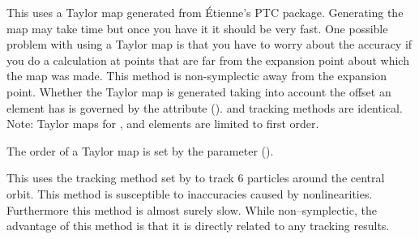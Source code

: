 \begin{description}
\item[\vn{Taylor}]
This uses a Taylor map generated from \'Etienne's PTC
package. Generating the map may take time but once you have it it
should be very fast. One possible problem with using a Taylor map is
that you have to worry about the accuracy if you do a calculation at
points that are far from the expansion point about which the map was
made. This method is non-symplectic away from the expansion
point. Whether the Taylor map is generated taking into account the
offset an element has is governed by the 
attribute ().  and 
tracking methods are identical. Note: Taylor maps for , and
 elements are limited to first order.

The order of a Taylor map is set by the 
parameter ().

\item[\vn{Tracking}]
This uses the tracking method set by  to track 6
particles around the central orbit. This method is susceptible to inaccuracies
caused by nonlinearities. Furthermore this method
is almost surely slow. While non--symplectic, the advantage of this method
is that it is directly related to any tracking results.

\end{description}


